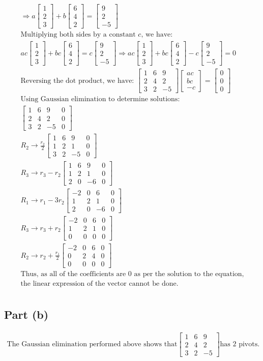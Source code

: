 \documentclass[letterpaper,10pt]{article}
\newcommand{\threematrix}[9]{
	\begin{bmatrix}
		#1 & #4 & #7 \\
		#2 & #5 & #8 \\
		#3 & #6 & #9
	\end{bmatrix}
}
\newcommand{\threevector}[3]{
	\begin{bmatrix}
		#1 \\ #2 \\ #3
	\end{bmatrix}
}
\begin{document}
			\begin{gather*}
				\Rightarrow a \threevector{1}{2}{3} + b \threevector{6}{4}{2} = \threevector{9}{2}{-5} \\
				\text{Multiplying both sides by a constant $c$, we have:} \\
				ac \threevector{1}{2}{3} + bc \threevector{6}{4}{2} = c \threevector{9}{2}{-5} \Rightarrow ac \threevector{1}{2}{3} + bc \threevector{6}{4}{2} - c \threevector{9}{2}{-5} = 0 \\
				\text{Reversing the dot product, we have: } \threematrix{1}{2}{3}{6}{4}{2}{9}{2}{-5} \threevector{ac}{bc}{-c} = \threevector{0}{0}{0} \\
				\text{Using Gaussian elimination to determine solutions:} \\
				\left[
				\begin{array}{ccc|c}
					1 & 6 & 9 & 0 \\
					2 & 4 & 2 & 0 \\
					3 & 2 & -5 & 0
				\end{array}
				\right] \\
				R_2 \rightarrow \frac{r_2}{2}
				\left[
				\begin{array}{ccc|c}
					1 & 6 & 9 & 0 \\
					1 & 2 & 1 & 0 \\
					3 & 2 & -5 & 0
				\end{array}
				\right] \\
				R_3 \rightarrow r_3-r_2
				\left[
				\begin{array}{ccc|c}
					1 & 6 & 9 & 0 \\
					1 & 2 & 1 & 0 \\
					2 & 0 & -6 & 0
				\end{array}
				\right] \\
				R_1 \rightarrow r_1 - 3r_2
				\left[
				\begin{array}{ccc|c}
					-2 & 0 & 6 & 0 \\
					1 & 2 & 1 & 0 \\
					2 & 0 & -6 & 0
				\end{array}
				\right] \\
				R_3 \rightarrow r_3 + r_2
				\left[
				\begin{array}{ccc|c}
					-2 & 0 & 6 & 0 \\
					1 & 2 & 1 & 0 \\
					0 & 0 & 0 & 0
				\end{array}
				\right] \\
				R_2 \rightarrow r_2 + \frac{r_1}{2}
				\left[
				\begin{array}{ccc|c}
					-2 & 0 & 6 & 0 \\
					0 & 2 & 4 & 0 \\
					0 & 0 & 0 & 0
				\end{array}
				\right] \\
				\text{Thus, as all of the coefficients are 0 as per the solution to the equation,} \\
				\text{the linear expression of the vector cannot be done.} \\
			\end{gather*}
		\subsection{Part (b)}
			\begin{gather*}
				\text{The Gaussian elimination performed above shows that}
				\threematrix{1}{2}{3}{6}{4}{2}{9}{2}{-5}
				\text{has 2 pivots.}
			\end{gather*}
\end{document}
